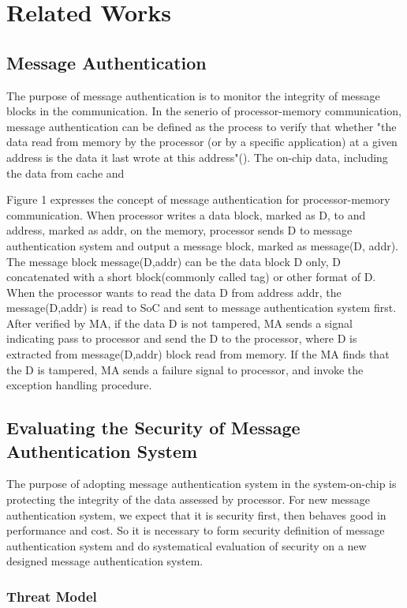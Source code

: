\documentclass{article}
\begin{document}
\section{Related Works}
\subsection{Message Authentication}
The purpose of message authentication is to monitor the integrity of message blocks in the communication. In the senerio of processor-memory communication, message authentication can be defined as the process to verify that whether "the data read from memory by the processor (or by a specific application) at a given address is the data it last wrote at this address"(\cite{hm_survey}). The on-chip data, including the data from cache and 

Figure 1 expresses the concept of message authentication for processor-memory communication. 
When processor writes a data block, marked as D, to and address, marked as addr, on the memory, processor sends D to message authentication system and output a message block, marked as message(D, addr). The message block message(D,addr) can be the data block D only, D concatenated with a short block(commonly called tag) or other format of D.
When the processor wants to read the data D from address addr, the message(D,addr) is read to SoC and sent to message authentication system first. After verified by MA, if the data D is not tampered, MA sends a signal indicating pass to processor and send the D to the processor, where D is extracted from message(D,addr) block read from memory.
If the MA finds that the D is tampered, MA sends a failure signal to processor, and invoke the exception handling procedure.

\subsection{Evaluating the Security of Message Authentication System}
The purpose of adopting message authentication system in the system-on-chip is protecting the integrity of the data assessed by processor. 
For new message authentication system, we expect that it is security first, then behaves good in performance and cost. So it is necessary to form security definition of message authentication system and do systematical evaluation of security on a new designed message authentication system.

\subsubsection{Threat Model}
\end{document}
